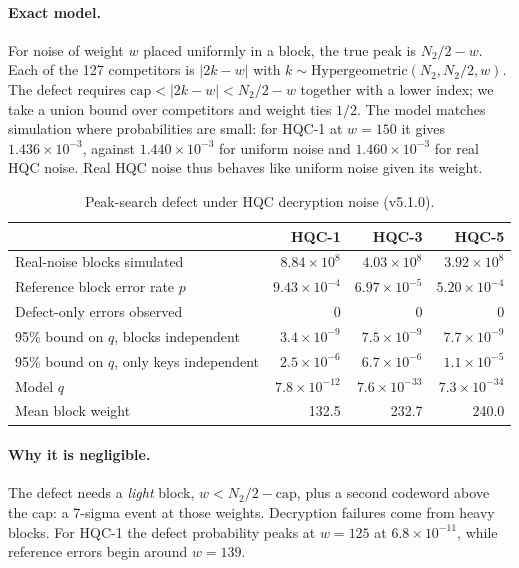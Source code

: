 \documentclass[11pt,a4paper]{article}
\begin{document}
\paragraph{Exact model.} For noise of weight $w$ placed uniformly in a block, the true peak is $N_2/2-w$. Each of the 127 competitors is $|2k-w|$ with $k\sim\mathrm{Hypergeometric}(N_2,N_2/2,w)$. The defect requires $\mathrm{cap}<|2k-w|<N_2/2-w$ together with a lower index; we take a union bound over competitors and weight ties $1/2$. The model matches simulation where probabilities are small: for HQC-1 at $w=150$ it gives $1.436\times10^{-3}$, against $1.440\times10^{-3}$ for uniform noise and $1.460\times10^{-3}$ for real HQC noise. Real HQC noise thus behaves like uniform noise given its weight.

\begin{table}[h]\centering\small
\begin{tabular}{lrrr}\hline
& HQC-1 & HQC-3 & HQC-5\\\hline
Real-noise blocks simulated & $8.84\times10^8$ & $4.03\times10^8$ & $3.92\times10^8$\\
Reference block error rate $p$ & $9.43\times10^{-4}$ & $6.97\times10^{-5}$ & $5.20\times10^{-4}$\\
Defect-only errors observed & 0 & 0 & 0\\
95\% bound on $q$, blocks independent & $3.4\times10^{-9}$ & $7.5\times10^{-9}$ & $7.7\times10^{-9}$\\
95\% bound on $q$, only keys independent & $2.5\times10^{-6}$ & $6.7\times10^{-6}$ & $1.1\times10^{-5}$\\
Model $q$ & $7.8\times10^{-12}$ & $7.6\times10^{-33}$ & $7.3\times10^{-34}$\\
Mean block weight & 132.5 & 232.7 & 240.0\\\hline
\end{tabular}
\caption{Peak-search defect under HQC decryption noise (v5.1.0).}\label{tab:dfr}
\end{table}

\paragraph{Why it is negligible.} The defect needs a \emph{light} block, $w<N_2/2-\mathrm{cap}$, plus a second codeword above the cap: a 7-sigma event at those weights. Decryption failures come from heavy blocks. For HQC-1 the defect probability peaks at $w=125$ at $6.8\times10^{-11}$, while reference errors begin around $w=139$.
\end{document}

